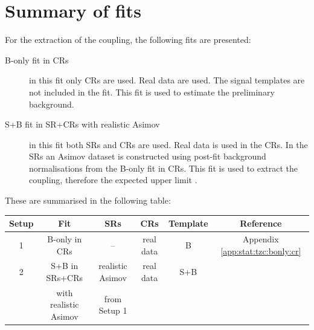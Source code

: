 \clearpage
\FloatBarrier

\section{Summary of fits}
\label{sec:stat:summary}
For the extraction of the \tZc coupling, the following fits
are presented:
\begin{description}
	\item[B-only fit in CRs] in this fit only CRs are used. Real data are
	used. The signal templates are not included in the fit. This fit is used to estimate
	the preliminary background.
	\item[S+B fit in SR+CRs with realistic Asimov] in this fit both SRs and CRs are used. Real
	data is used in the CRs. In the SRs an Asimov dataset is constructed
	using post-fit background normalisations from the B-only fit in CRs.  This fit is used to extract
	the \tZc coupling, therefore the expected upper limit .
\end{description}
These are summarised in the following table:

\begin{table}[htbp]
	\small
	\centering
	\begin{tabular}{cccccc}
		\toprule
		Setup & Fit & SRs & CRs & Template & Reference \\
		\midrule
		1 & B-only in CRs & -- & real data & B  & Appendix \ref{app:stat:tzc:bonly:cr} \\
		\midrule
		2 & S+B in SRs+CRs & realistic Asimov & real data & S+B  & \Cref{sec:stat:tzc:splusb:crsr} \\
		& with realistic Asimov & from Setup 1 & & & \\
		\bottomrule
	\end{tabular}
\end{table}



